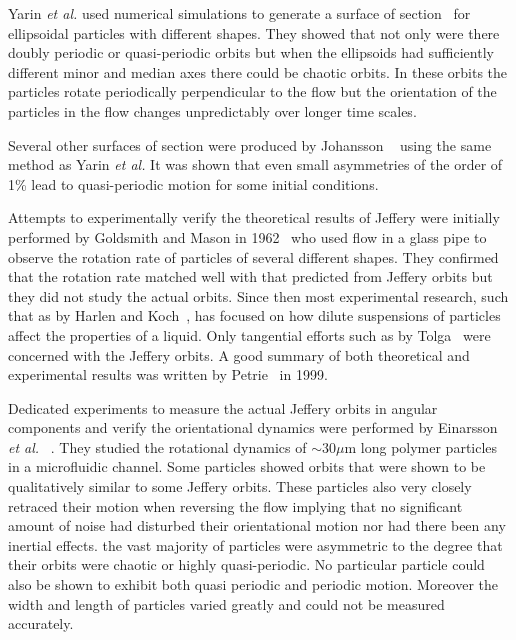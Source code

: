 Yarin \emph{et al.} used numerical simulations to generate a surface of section~\cite{SurfaceOfSection} for ellipsoidal particles with different shapes. They showed that not only were there doubly periodic or quasi-periodic orbits but when the ellipsoids had sufficiently different minor and median axes there could be chaotic orbits. In these orbits the particles rotate periodically perpendicular to the flow but the orientation of the particles in the flow changes unpredictably over longer time scales. %

Several other surfaces of section were produced by Johansson ~\cite{AntonThesis} using the same method as Yarin \emph{et al.} It was shown that even small asymmetries of the order of 1\% lead to quasi-periodic motion for some initial conditions.

Attempts to experimentally verify the theoretical results of Jeffery were initially performed by Goldsmith and Mason in 1962~\cite{Mason} who used flow in a glass pipe to observe the rotation rate of particles of several different shapes. They confirmed that the rotation rate matched well with that predicted from Jeffery orbits but they did not study the actual orbits. Since then most experimental research, such that as by Harlen and Koch~\cite{fibersspension}, has focused on how dilute suspensions of particles affect the properties of a liquid. Only tangential efforts such as by Tolga~\cite{Tolga} were concerned with the Jeffery orbits. A good summary of both theoretical and experimental results was written by Petrie~\cite{Petrie} in 1999.

Dedicated experiments to measure the actual Jeffery orbits in angular components and verify the orientational dynamics were performed by Einarsson \emph{et al.} ~\cite{JonasExperiment}. They studied the rotational dynamics of $\sim30 \mu$m long polymer particles in a microfluidic channel. Some particles showed orbits that were shown to be qualitatively similar to some Jeffery orbits. These particles also very closely retraced their motion when reversing the flow implying that no significant amount of noise had disturbed their orientational motion nor had there been any inertial effects. the vast majority of particles were asymmetric to the degree that their orbits were chaotic or highly quasi-periodic. No particular particle could also be shown to exhibit both quasi periodic and periodic motion. Moreover the width and length of particles varied greatly and could not be measured accurately.


